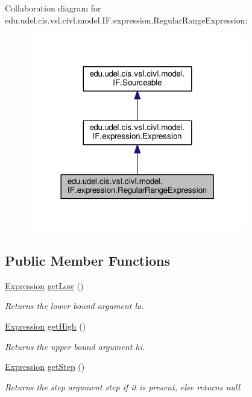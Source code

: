 Collaboration diagram for edu.\+udel.\+cis.\+vsl.\+civl.\+model.\+I\+F.\+expression.\+Regular\+Range\+Expression\+:
\nopagebreak
\begin{figure}[H]
\begin{center}
\leavevmode
\includegraphics[width=270pt]{interfaceedu_1_1udel_1_1cis_1_1vsl_1_1civl_1_1model_1_1IF_1_1expression_1_1RegularRangeExpression__coll__graph}
\end{center}
\end{figure}
\subsection*{Public Member Functions}
\begin{DoxyCompactItemize}
\item 
\hyperlink{interfaceedu_1_1udel_1_1cis_1_1vsl_1_1civl_1_1model_1_1IF_1_1expression_1_1Expression}{Expression} \hyperlink{interfaceedu_1_1udel_1_1cis_1_1vsl_1_1civl_1_1model_1_1IF_1_1expression_1_1RegularRangeExpression_ac4b7e10bc1c5d031178094fb927ed77d}{get\+Low} ()
\begin{DoxyCompactList}\small\item\em Returns the lower bound argument {\ttfamily lo}. \end{DoxyCompactList}\item 
\hyperlink{interfaceedu_1_1udel_1_1cis_1_1vsl_1_1civl_1_1model_1_1IF_1_1expression_1_1Expression}{Expression} \hyperlink{interfaceedu_1_1udel_1_1cis_1_1vsl_1_1civl_1_1model_1_1IF_1_1expression_1_1RegularRangeExpression_ab5997c91acffec742be119e0d3c19b71}{get\+High} ()
\begin{DoxyCompactList}\small\item\em Returns the upper bound argument {\ttfamily hi}. \end{DoxyCompactList}\item 
\hyperlink{interfaceedu_1_1udel_1_1cis_1_1vsl_1_1civl_1_1model_1_1IF_1_1expression_1_1Expression}{Expression} \hyperlink{interfaceedu_1_1udel_1_1cis_1_1vsl_1_1civl_1_1model_1_1IF_1_1expression_1_1RegularRangeExpression_a6dfffed1acc621fdc978c0e351ac4180}{get\+Step} ()
\begin{DoxyCompactList}\small\item\em Returns the step argument {\ttfamily step} if it is present, else returns {\ttfamily null} \end{DoxyCompactList}\end{DoxyCompactItemize}


